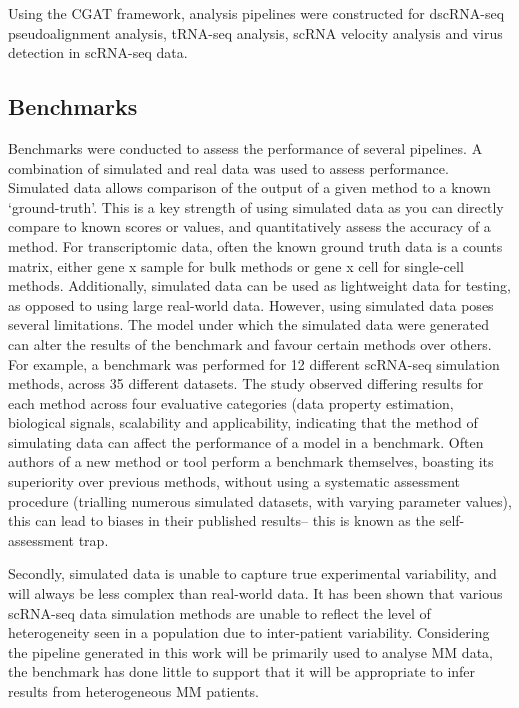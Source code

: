 Using the CGAT framework, analysis pipelines were constructed for dscRNA-seq pseudoalignment analysis, tRNA-seq analysis, scRNA velocity analysis and virus detection in scRNA-seq data.

\subsection{Benchmarks}

Benchmarks were conducted to assess the performance of several pipelines.
A combination of simulated and real data was used to assess performance.
Simulated data allows comparison of the output of a given method to a known `ground-truth'.
This is a key strength of using simulated data as you can directly compare to known scores or values, and quantitatively assess the accuracy of a method.
For transcriptomic data, often the known ground truth data is a counts matrix, either gene x sample for bulk methods or gene x cell for single-cell methods.
Additionally, simulated data can be used as lightweight data for testing, as opposed to using large real-world data.
However, using simulated data poses several limitations.
The model under which the simulated data were generated can alter the results of the benchmark and favour certain methods over others.
For example, a benchmark was performed for 12 different scRNA-seq simulation methods, across 35 different datasets\cite{cao2021benchmark}.
The study observed differing results for each method across four evaluative categories (data property estimation, biological signals, scalability and applicability\cite{cao2021benchmark}, indicating that the method of simulating data can affect the performance of a model in a benchmark.
Often authors of a new method or tool perform a benchmark themselves, boasting its superiority over previous methods, without using a systematic assessment procedure (trialling numerous simulated datasets, with varying parameter values), this can lead to biases in their published results-- this is known as the self-assessment trap\cite{mangul2019systematic}.

Secondly, simulated data is unable to capture true experimental variability, and will always be less complex than real-world data\cite{mangul2019systematic}.
It has been shown that various scRNA-seq data simulation methods are unable to reflect the level of heterogeneity seen in a population due to inter-patient variability\cite{cao2021benchmark}.
Considering the pipeline generated in this work will be primarily used to analyse MM data, the benchmark has done little to support that it will be appropriate to infer results from heterogeneous MM patients.

